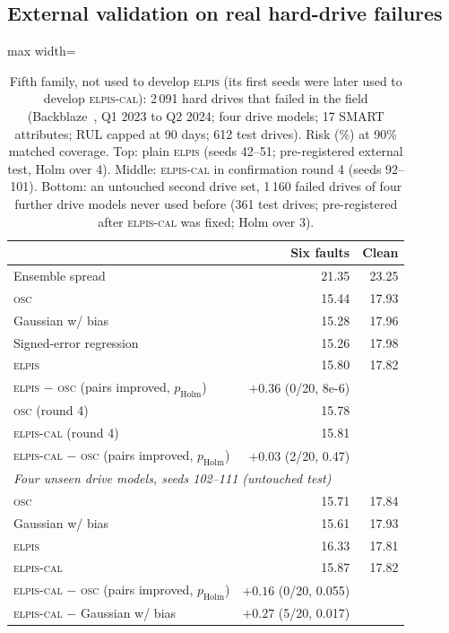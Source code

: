 \documentclass{esannV2}
\newcommand{\OSC}{\textsc{osc}}
\newcommand{\RPT}{\textsc{elpis}}
\newcommand{\AUTO}{\textsc{elpis-cal}}
\begin{document}
\subsection{External validation on real hard-drive failures}\label{sec:hdd}
\begin{table}[!htbp]
\caption{Fifth family, not used to develop \RPT{} (its first seeds were later used to develop \AUTO): 2\,091 hard drives that failed in the field (Backblaze~\cite{backblaze}, Q1 2023 to Q2 2024; four drive models; 17 SMART attributes; RUL capped at 90 days; 612 test drives). Risk (\%) at 90\% matched coverage. Top: plain \RPT{} (seeds 42--51; pre-registered external test, Holm over 4). Middle: \AUTO{} in confirmation round 4 (seeds 92--101). Bottom: an untouched second drive set, 1\,160 failed drives of four further drive models never used before (361 test drives; pre-registered after \AUTO{} was fixed; Holm over 3).}
\label{tab:hdd}
\centering\footnotesize
\begin{adjustbox}{max width=\textwidth}\begin{tabular}{lrr}
\toprule
 & Six faults & Clean\\
\midrule
Ensemble spread~\cite{lakshminarayanan2017simple} & 21.35 & 23.25\\
\OSC & 15.44 & 17.93\\
Gaussian w/ bias~\cite{nix1994estimating} & 15.28 & 17.96\\
Signed-error regression~\cite{yoo2019learning} & 15.26 & 17.98\\
\RPT & 15.80 & 17.82\\
\quad \RPT{} $-$ \OSC{} (pairs improved, $p_{\text{Holm}}$) & $+0.36$ (0/20, 8e-6) & \\
\midrule
\OSC{} (round 4) & 15.78 & \\
\AUTO{} (round 4) & 15.81 & \\
\quad \AUTO{} $-$ \OSC{} (pairs improved, $p_{\text{Holm}}$) & $+0.03$ (2/20, 0.47) & \\
\midrule
\multicolumn{3}{l}{\emph{Four unseen drive models, seeds 102--111 (untouched test)}}\\
\OSC & 15.71 & 17.84\\
Gaussian w/ bias~\cite{nix1994estimating} & 15.61 & 17.93\\
\RPT & 16.33 & 17.81\\
\AUTO & 15.87 & 17.82\\
\quad \AUTO{} $-$ \OSC{} (pairs improved, $p_{\text{Holm}}$) & $+0.16$ (0/20, 0.055) & \\
\quad \AUTO{} $-$ Gaussian w/ bias~\cite{nix1994estimating} & $+0.27$ (5/20, 0.017) & \\
\bottomrule
\end{tabular}\end{adjustbox}
\end{table}
\end{document}
